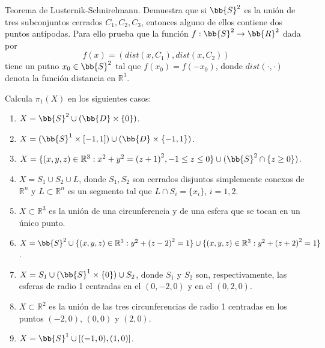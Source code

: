 \begin{ejercicio}
    Teorema de Lusternik-Schnirelmann. Demuestra que si $\bb{S}^2$ es la unión de tres subconjuntos cerrados $C_1,C_2,C_3$, entonces alguno de ellos contiene dos puntos antípodas. Para ello prueba que la función $f:\bb{S}^2\to \bb{R}^2$ dada por
    \begin{equation*}
        f(x) = (dist(x,C_1), dist(x,C_2))
    \end{equation*}
    tiene un putno $x_0\in \bb{S}^2$ tal que $f(x_0) = f(-x_0)$, donde $dist(\cdot ,\cdot )$ denota la función distancia en $\mathbb{R}^3$.
\end{ejercicio}

\begin{ejercicio}
    Calcula $\pi_1(X)$ en los siguientes casos:
    \begin{enumerate}[label=\alph*)]
        \item $X=\bb{S}^2 \cup (\bb{D}\times \{0\})$.
        \item $X=(\bb{S}^1 \times [-1,1])\cup (\bb{D}\times \{-1,1\})$.
        \item $X = \{(x,y,z)\in \mathbb{R}^3 : x^2+y^2 = {(z+1)}^{2}, -1\leq z\leq 0\}\cup (\bb{S}^2 \cap \{z\geq 0\})$.
        \item $X = S_1 \cup S_2 \cup L$, donde $S_1,S_2$ son cerrados disjuntos simplemente conexos de $\mathbb{R}^n$ y $L\subset \mathbb{R}^n$ es un segmento tal que $L\cap S_i =\{x_i\}$, $i = 1,2$.
        \item $X\subset \mathbb{R}^3$ es la unión de una circunferencia y de una esfera que se tocan en un único punto.
        \item $X = \bb{S}^2\cup \{(x,y,z)\in \mathbb{R}^3 : y^2 + {(z-2)}^{2} = 1\}\cup \{(x,y,z)\in \mathbb{R}^3 : y^2 + {(z+2)}^{2}=1\}$.
        \item $X = S_1 \cup (\bb{S}^1 \times \{0\})\cup S_2$, donde $S_1$ y $S_2$ son, respectivamente, las esferas de radio 1 centradas en el $(0,-2,0)$ y en el $(0,2,0)$.
        \item $X\subset \mathbb{R}^2$ es la unión de las tres circunferencias de radio 1 centradas en los puntos $(-2,0)$, $(0,0)$ y $(2,0)$.
        \item $X = \bb{S}^1\cup [(-1,0), (1,0)]$.
    \end{enumerate}
\end{ejercicio}

